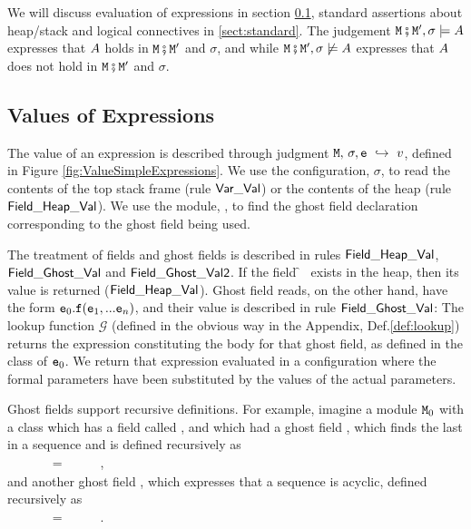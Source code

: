 We will discuss evaluation of expressions in section \ref{sect:expressions}, standard assertions about heap/stack and logical
 connectives in \ref{sect:standard}. 
 The judgement ${\mbox{\tt{\ensuremath{{\mbox{\tt{M}}}}}}}\fatsemi {\mbox{\tt{\ensuremath{{\mbox{\tt{M}}}}}}}', \sigma  \models A$ expresses that $A$ holds in  ${\mbox{\tt{\ensuremath{{\mbox{\tt{M}}}}}}}\fatsemi {\mbox{\tt{\ensuremath{{\mbox{\tt{M}}}}}}}'$ and $\sigma$, and 
while ${\mbox{\tt{\ensuremath{{\mbox{\tt{M}}}}}}}\fatsemi {\mbox{\tt{\ensuremath{{\mbox{\tt{M}}}}}}}', \sigma  \not\models A$  expresses that $A$ does not hold  in  ${\mbox{\tt{\ensuremath{{\mbox{\tt{M}}}}}}}\fatsemi {\mbox{\tt{\ensuremath{{\mbox{\tt{M}}}}}}}'$ and $\sigma$.
 
\subsection{Values of Expressions}
\label{sect:expressions}

The value  of  an expression  is described through judgment $ {\mbox{\tt{\ensuremath{{\mbox{\tt{M}}}}}}},\, \sigma, {\mbox{\tt{e}}} \ \hookrightarrow\  v$,
defined in  Figure \ref{fig:ValueSimpleExpressions}.
We use the configuration, $\sigma$, to read the contents of the top stack frame
(rule ${\sf {Var\_Val}}$) or the contents of the heap (rule
${\sf {Field\_Heap\_Val}}$). We use the module, \M, to find the  ghost field declaration corresponding to the
ghost field being used. 


The treatment of fields and ghost fields is described in rules ${\sf {Field\_Heap\_Val}}$,\\  ${\sf {Field\_Ghost\_Val}}$ and 
${\sf {Field\_Ghost\_Val2}}$.  If the field \f~ exists in the heap, then its value is returned (${\sf {Field\_Heap\_Val}}$). 
Ghost field reads, on the other hand, have the form ${\mbox{\tt{e}}}_0.{\mbox{\tt{f}}}({\mbox{\tt{e}}}_1,...{\mbox{\tt{e}}}_n)$, and their value is
described in rule ${\sf {Field\_Ghost\_Val}}$:
%
The lookup function $\mathcal G$  (defined in the obvious way in the Appendix, Def.\ref{def:lookup})
returns the expression constituting the body for that ghost field, as defined in the class of ${\mbox{\tt{e}}}_0$.
We return  that expression
evaluated in a configuration where the formal parameters have been substituted by the values of the actual
parameters.

Ghost fields support recursive definitions. For example, imagine a module ${\mbox{\tt{\ensuremath{{\mbox{\tt{M}}}}}}}_0$ with
a class  which has a field called , and which 
had a ghost field , which finds  the last  in a sequence
and is defined recursively as \\
$~ \strut \hspace{.1cm}$ \ \ \ \ \ =\   \  \  \ ,\\
and another ghost field , which expresses that a sequence is acyclic,
defined recursively as \\
$~ \strut \hspace{.1cm}$ \ \ \ \ \ =\   \  \  \ .

